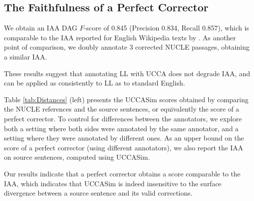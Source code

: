 \documentclass[letterpaper, 11pt]{article}
\begin{document}
%
%
%
\subsection{The Faithfulness of a Perfect Corrector}
We obtain an IAA DAG $F$-score of 0.845
(Precision 0.834, Recall 0.857), which
is comparable to the IAA reported for English Wikipedia texts by \cite{abend2013universal}.
As another point of comparison, we doubly annotate 3 corrected
NUCLE passages, obtaining a similar IAA.

These results suggest that annotating LL with UCCA does not degrade IAA, and can be applied as consistently to LL as to standard English.

Table \ref{tab:Distances} (left)
presents the {\sc UCCASim} scores obtained by comparing the NUCLE references and the source
sentences, or equivalently the score of a perfect corrector.
To control for differences between the annotators, we explore both
a setting where both sides were annotated by the same annotator,
and a setting where they were annotated by different ones.
As an upper bound on the score of a perfect corrector (using different annotators),
we also report the IAA on source sentences, computed using {\sc UCCASim}. 

Our results indicate that a perfect corrector obtains a score comparable
to the IAA, which indicates that {\sc UCCASim} is indeed
insensitive to the surface divergence between a source sentence and its valid corrections.
\end{document}
